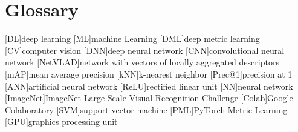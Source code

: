\chapter{Glossary}
\label{chap:gloss}


\begin{acronym}[ECU]
	[DL]{deep learning}
	[ML]{machine Learning}
	[DML]{deep metric learning}
	[CV]{computer vision}
	[DNN]{deep neural network}
	[CNN]{convolutional neural network}
	[NetVLAD]{network with vectors of locally aggregated descriptors}
	[mAP]{mean average precision}
	[kNN]{k-nearest neighbor}
	[Prec@1]{precision at 1}
	[ANN]{artificial neural network}
	[ReLU]{rectified linear unit}
	[NN]{neural network}
	[ImageNet]{ImageNet Large Scale Visual Recognition Challenge}
	[Colab]{Google Colaboratory}
	[SVM]{support vector machine}
	[PML]{PyTorch Metric Learning}
	[GPU]{graphics processing unit}
\end{acronym}

